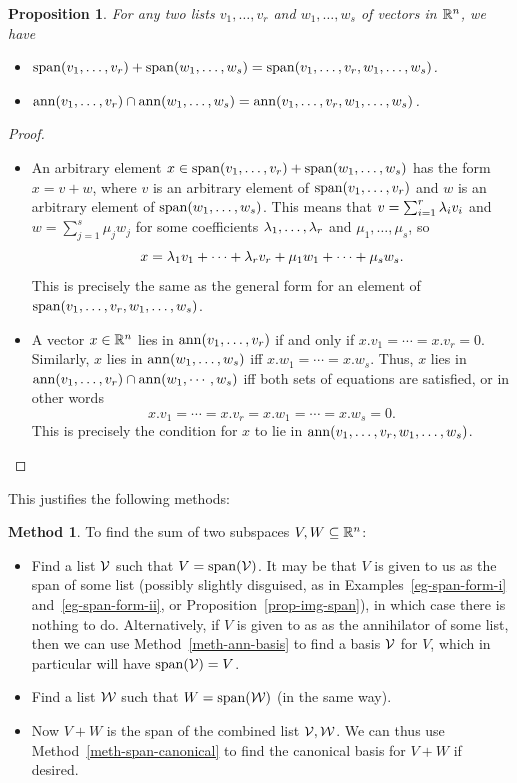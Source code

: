 \documentclass[reqno]{amsart}
\newtheorem{proposition}[theorem]{Proposition}
\theoremstyle{definition}
\newtheorem{method}[theorem]{Method}
\begin{document}
\begin{proposition}\label{prop-sum-meet-concat}
 For any two lists $v_1,\dotsc,v_r$ and $w_1,\dotsc,w_s$ of vectors in
 ${\mathbb{R}}^n$, we have
 \begin{itemize}
  \item[(a)] $\operatorname{span}(v_1,\dotsc,v_r)+\operatorname{span}(w_1,\dotsc,w_s)=
              \operatorname{span}(v_1,\dotsc,v_r,w_1,\dotsc,w_s)$.
  \item[(b)] $\operatorname{ann}(v_1,\dotsc,v_r)\cap\operatorname{ann}(w_1,\dotsc,w_s)=
              \operatorname{ann}(v_1,\dotsc,v_r,w_1,\dotsc,w_s)$.
 \end{itemize}
\end{proposition}
\begin{proof}
 \begin{itemize}
  \item[(a)] An arbitrary element
   $x\in\operatorname{span}(v_1,\dotsc,v_r)+\operatorname{span}(w_1,\dotsc,w_s)$ has the form
   $x=v+w$, where $v$ is an arbitrary element of
   $\operatorname{span}(v_1,\dotsc,v_r)$ and $w$ is an arbitrary element of
   $\operatorname{span}(w_1,\dotsc,w_s)$.  This means that $v=\sum_{i=1}^r\lambda_iv_i$
   and $w=\sum_{j=1}^s\mu_jw_j$ for some coefficients
   $\lambda_1,\dotsc,\lambda_r$ and $\mu_1,\dotsc,\mu_s$, so
   \[ x = \lambda_1v_1+\dotsb+\lambda_rv_r + \mu_1w_1+\dotsb+\mu_sw_s. \]
   This is precisely the same as the general form for an element of
   $\operatorname{span}(v_1,\dotsc,v_r,w_1,\dotsc,w_s)$.
  \item[(b)] A vector $x\in{\mathbb{R}}^n$ lies in $\operatorname{ann}(v_1,\dotsc,v_r)$ if and
   only if $x.v_1=\dotsb=x.v_r=0$.  Similarly, $x$ lies in
   $\operatorname{ann}(w_1,\dotsc,w_s)$ iff $x.w_1=\dotsb=x.w_s$.  Thus, $x$ lies in
   $\operatorname{ann}(v_1,\dotsc,v_r)\cap\operatorname{ann}(w_1,\dotsb,w_s)$ iff both sets of
   equations are satisfied, or in other words
   \[ x.v_1=\dotsb=x.v_r=x.w_1=\dotsb=x.w_s=0. \]
   This is precisely the condition for $x$ to lie in
   $\operatorname{ann}(v_1,\dotsc,v_r,w_1,\dotsc,w_s)$.
 \end{itemize}
\end{proof}

This justifies the following methods:
\begin{method}\label{meth-find-sum}
 To find the sum of two subspaces $V,W\subseteq{\mathbb{R}}^n$:
 \begin{itemize}
  \item[(a)] Find a list $\mathcal{V}$ such that $V=\operatorname{span}(\mathcal{V})$.  It may be
   that $V$ is given to us as the span of some list (possibly slightly
   disguised, as in Examples~\ref{eg-span-form-i}
   and~\ref{eg-span-form-ii}, or Proposition~\ref{prop-img-span}), in
   which case there is nothing to do.  Alternatively, if $V$ is given
   to as as the annihilator of some list, then we can use
   Method~\ref{meth-ann-basis} to find a basis $\mathcal{V}$ for $V$, which in
   particular will have $\operatorname{span}(\mathcal{V})=V$.
  \item[(b)] Find a list $\mathcal{W}$ such that $W=\operatorname{span}(\mathcal{W})$ (in the same
   way).
  \item[(c)] Now $V+W$ is the span of the combined list $\mathcal{V},\mathcal{W}$.  We
   can thus use Method~\ref{meth-span-canonical} to find the canonical
   basis for $V+W$ if desired.
 \end{itemize}
\end{method}
\end{document}
